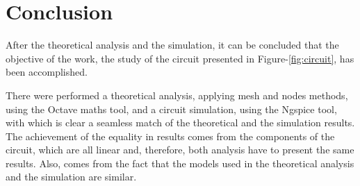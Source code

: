 \section{Conclusion}
\label{sec:conclusion}

After the theoretical analysis and the simulation, it can be concluded that the
objective of the work, the study of the circuit presented in Figure-\ref{fig:circuit},
has been accomplished. \par
There were performed a theoretical analysis, applying mesh and nodes methods,
using the Octave maths tool, and a circuit simulation, using the Ngspice tool, with which is clear a seamless match of the theoretical and the simulation results. The achievement of the equality in results comes from the components of the circuit, which are all linear and, therefore, both analysis have to present the same results. Also, comes from the fact that the models used in the theoretical analysis and the simulation are similar.
